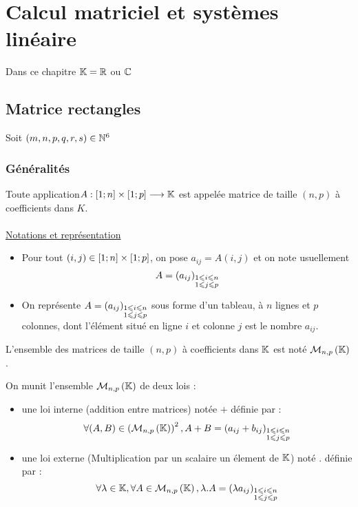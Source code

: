 \chapter{Calcul matriciel et systèmes linéaire}

\minitoc

Dans ce chapitre \(\mathbb{K} = \mathbb{R}\) ou \(\mathbb{C}\)
\section{Matrice rectangles}
Soit \((m,n,p,q,r,s)\in \mathbb{N}^6\)
\subsection{Généralités}
\begin{defi}
    Toute application\( A :\left[1;n\right]\times \left[1;p\right] \longrightarrow \mathbb{K}\) est appelée matrice de taille \((n, p)\) à coefficients dans \(K\).\\~\\
    \underline{Notations et représentation}
    \begin{itemize}
        \item Pour tout \((i, j) \in \left[1;n\right]\times \left[1;p\right] \), on pose \(a_{ij} = A(i, j)\) et on note usuellement
            \[A = \left(a_{ij}\right)_{\substack {1\leqslant i \leqslant n \\ 1\leqslant j \leqslant p}}\]
        \item On représente \(A = {\left(a_{ij}\right)}_{\substack{1\leqslant i \leqslant n \\ 1\leqslant j \leqslant p}}\) sous forme d’un tableau, à \(n\) lignes et \(p\) colonnes, dont l’élément situé en ligne \(i\) et colonne \(j\) est le nombre \(a_{ij}\).
    \end{itemize}
\end{defi}

\begin{defprop}
   L’ensemble des matrices de taille \((n, p)\) à coefficients dans \(\mathbb{K}\) est noté \(\mathcal{M}_{n,p}\left(\mathbb{K}\right)\). 
\end{defprop}

\begin{defprop}
    On munit l'ensemble \(\mathcal{M}_{n,p}\left(\mathbb{K}\right)\) de deux lois :
    \begin{itemize}
        \item une loi interne (addition entre matrices) notée \(+\) définie par :
        \[\forall (A,B) \in \left(\mathcal{M}_{n,p}\left(\mathbb{K}\right)\right)^2, A+B = {\left(a_{ij} + b_{ij}\right)}_{\substack {1\leqslant i \leqslant n \\ 1\leqslant j \leqslant p}}\]
        \item une loi externe (Multiplication par un scalaire \ie un élement de \(\mathbb{K}\)) noté \(.\) définie par : 
        \[\forall \lambda \in \mathbb{K}, \forall A \in \mathcal{M}_{n,p}\left(\mathbb{K}\right), \lambda . A  = \left(\lambda a_{ij}\right)_{\substack {1\leqslant i \leqslant n \\ 1\leqslant j \leqslant p}}\]
    \end{itemize}
\end{defprop}

